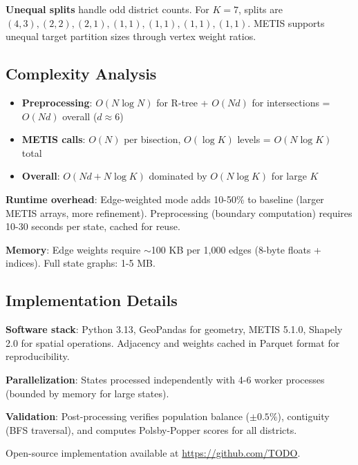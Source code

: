 \textbf{Unequal splits} handle odd district counts. For $K = 7$, splits are $(4,3), (2,2), (2,1), (1,1), (1,1), (1,1), (1,1)$. METIS supports unequal target partition sizes through vertex weight ratios.

\subsection{Complexity Analysis}

\begin{itemize}
    \item \textbf{Preprocessing}: $O(N \log N)$ for R-tree + $O(Nd)$ for intersections = $O(Nd)$ overall ($d \approx 6$)
    \item \textbf{METIS calls}: $O(N)$ per bisection, $O(\log K)$ levels = $O(N \log K)$ total
    \item \textbf{Overall}: $O(Nd + N \log K)$ dominated by $O(N \log K)$ for large $K$
\end{itemize}

\textbf{Runtime overhead}: Edge-weighted mode adds 10-50\% to baseline (larger METIS arrays, more refinement). Preprocessing (boundary computation) requires 10-30 seconds per state, cached for reuse.

\textbf{Memory}: Edge weights require $\sim$100 KB per 1,000 edges (8-byte floats + indices). Full state graphs: 1-5 MB.

\subsection{Implementation Details}

\textbf{Software stack}: Python 3.13, GeoPandas for geometry, METIS 5.1.0, Shapely 2.0 for spatial operations. Adjacency and weights cached in Parquet format for reproducibility.

\textbf{Parallelization}: States processed independently with 4-6 worker processes (bounded by memory for large states).

\textbf{Validation}: Post-processing verifies population balance ($\pm 0.5\%$), contiguity (BFS traversal), and computes Polsby-Popper scores for all districts.

Open-source implementation available at \url{https://github.com/TODO}.
